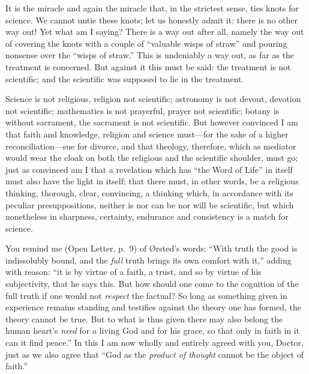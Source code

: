 \documentclass[12pt,a4paper]{article}
\newcommand{\opage}[1]{\marginnote{\footnotesize\textit{[#1]}}}
\begin{document}
It is the miracle and again the miracle that, in the strictest
sense, ties knots for science. We cannot untie these knots; let us
honestly admit it: there is no other way out! Yet what am I saying?
There is a way out after all, namely the way out of covering the
knots with a couple of ``valuable wisps of straw'' and pouring
nonsense over the ``wisps of straw.'' This is undeniably a way out,
as far as the treatment is concerned. But against it this must be
said: the treatment is not scientific; and the scientific was
supposed to lie in the treatment.

Science is not religious, religion not scientific; astronomy is not
devout, devotion not scientific; mathematics is not prayerful,
prayer not scientific; botany is without sacrament, the sacrament is
not scientific. But however convinced I am that faith and knowledge,
religion and science must---for the sake of a higher
reconciliation---sue for divorce, and that theology, therefore,
which as mediator would wear the cloak on both the religious and the
scientific shoulder, must go; just as convinced am I that a
revelation which has ``the Word of Life'' in itself must also have
the light in itself; that there must, in other words, be a religious
thinking, thorough, clear, convincing, a thinking which, in
accordance with its peculiar presuppositions, neither is nor can be
nor will be scientific, but which nonetheless in sharpness,
certainty, endurance and consistency is a match for science.

You remind me (Open Letter, p.~9) of Ørsted's words: ``With truth
the good is indissolubly bound, and the \emph{full} truth brings its
own comfort with it,'' adding with reason: ``it is by virtue of a
faith, a trust, and so by virtue of his subjectivity, that he says
this. But how should one come to the cognition of the full
\opage{12}%
truth if one would not \emph{respect} the factual? So long as
something given in experience remains standing and testifies against
the theory one has formed, the theory cannot be true. But to what is
thus given there may also belong the human heart's \emph{need} for a
living God and for his grace, so that only in faith in it can it
find peace.'' In this I am now wholly and entirely agreed with you,
Doctor, just as we also agree that ``God as the \emph{product of
thought} cannot be the object of faith.''
\end{document}

